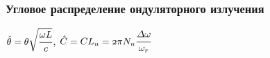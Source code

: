\documentclass[14pt, hyperref = {colorlinks}]{beamer}
\begin{document}
\small
\begin{frame}
\frametitle{Угловое распределение ондуляторного излучения}\label{t1}
\begin{figure}[h]
	\begin{minipage}[h]{0.49\linewidth}
		\vspace{-30pt}
	\end{minipage}	
	\begin{minipage}[h]{0.49\linewidth}
		\vspace{-30pt}
	\end{minipage}
\end{figure}
\hspace{-0pt}\tiny{$\hat{\theta} = \theta\sqrt{\cfrac{\omega L}{c}}$}, \tiny{$\mathnormal{\hat{C} = CL_u = 2\pi N_u\cfrac{\Delta\omega}{\omega_r}}$}
\end{frame}
\end{document}
